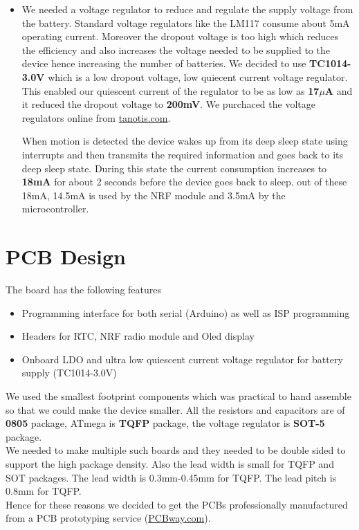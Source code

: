 \begin{itemize}
\item We needed a voltage regulator to reduce and regulate the supply voltage from the battery. Standard voltage regulators like the LM117 consume about 5mA operating current. Moreover the dropout voltage is too high which reduces the efficiency and also increases the voltage needed to be supplied to the device hence increasing the number of batteries.
We decided to use \textbf{TC1014-3.0V} which is a low dropout voltage, low quiecent current voltage regulator. This enabled our quiescent current of the regulator to be as low as \textbf{17$\mu$A} and it reduced the dropout voltage to \textbf{200mV}.
We purchaced the voltage regulators online from \url{tanotis.com}.

When motion is detected the device wakes up from its deep sleep state using interrupts and then transmits the required information and goes back to its deep sleep state. During this state the current consumption increases to \textbf{18mA} for about 2 seconds before the device goes back to sleep. out of these 18mA, 14.5mA is used by the NRF module and 3.5mA by the microcontroller.
\end{itemize}

\section{PCB Design}
The board has the following features
\begin{itemize}
	\item Programming interface for both serial (Arduino) as well as ISP programming
	\item Headers for RTC, NRF radio module and Oled display
	\item Onboard LDO and ultra low quiescent current voltage regulator for battery supply (TC1014-3.0V)
\end{itemize}

We used the smallest footprint components which was practical to hand assemble so that we could make the device smaller. All the resistors and capacitors are of \textbf{0805} package, ATmega is \textbf{TQFP} package, the voltage regulator is \textbf{SOT-5} package.
\\
We needed to make multiple such boards and they needed to be double sided to support the high package density. Also the lead width is small for TQFP and SOT packages. The lead width is 0.3mm-0.45mm for TQFP.
The lead pitch is 0.8mm for TQFP. 
\\Hence for these reasons we decided to get the PCBs professionally manufactured from a PCB prototyping service (\url{PCBway.com})\cite{pcbway}.

